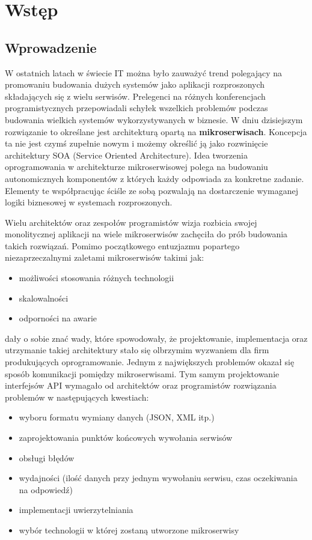 \chapter{Wstęp}
\section{Wprowadzenie}
W ostatnich latach w świecie IT można było zauważyć trend polegający na promowaniu budowania dużych systemów jako aplikacji rozproszonych składających się z wielu serwisów. Prelegenci na różnych konferencjach programistycznych przepowiadali schyłek wszelkich problemów podczas budowania wielkich systemów wykorzystywanych w biznesie. W dniu dzisiejszym rozwiązanie to określane jest architekturą opartą na \textbf{mikroserwisach}. Koncepcja ta nie jest czymś zupełnie nowym i możemy określić ją jako rozwinięcie architektury SOA (Service Oriented Architecture). Idea tworzenia oprogramowania w architekturze mikroserwisowej polega na budowaniu autonomicznych komponentów z których każdy odpowiada za konkretne zadanie. Elementy te współpracując ściśle ze sobą pozwalają na dostarczenie wymaganej logiki biznesowej w systemach rozproszonych. \par Wielu architektów oraz zespołów programistów wizja rozbicia swojej monolitycznej aplikacji na wiele mikroserwisów zachęciła do prób budowania takich rozwiązań. Pomimo początkowego entuzjazmu popartego niezaprzeczalnymi zaletami mikroserwisów takimi jak:
\begin{itemize}
	\item możliwości stosowania różnych technologii
	\item skalowalności
	\item odporności na awarie
\end{itemize}
dały o sobie znać wady, które spowodowały, że projektowanie, implementacja oraz utrzymanie takiej architektury stało się olbrzymim wyzwaniem dla firm produkujących oprogramowanie. Jednym z największych problemów okazał się sposób komunikacji pomiędzy mikroserwisami. Tym samym projektowanie interfejsów API \cite{jacobson2015interfejsapi} wymagało od architektów oraz programistów rozwiązania problemów w następujących kwestiach:
\begin{itemize}
	\item wyboru formatu wymiany danych (JSON, XML itp.)
	\item zaprojektowania punktów końcowych wywołania serwisów
	\item obsługi błędów 
	\item wydajności (ilość danych przy jednym wywołaniu serwisu, czas oczekiwania na odpowiedź)
	\item implementacji uwierzytelniania
	\item wybór technologii w której zostaną utworzone mikroserwisy
\end{itemize}
